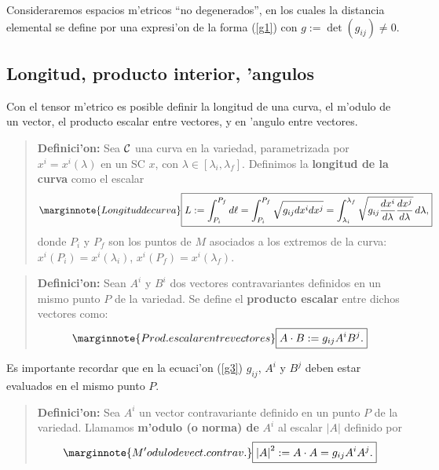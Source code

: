 Consideraremos espacios m'etricos ``no degenerados'', en los cuales la distancia
elemental se define por una expresi'on de la forma (\ref{g1}) con $g:=\det(g_{ij})\neq 0$.

\subsection{Longitud, producto interior, 'angulos}
Con el tensor m'etrico es posible definir la longitud de una curva, el m'odulo de un vector, el producto escalar entre vectores, y en 'angulo entre vectores.
\begin{quotation}
\textbf{Definici'on:} Sea $\cal C$ una curva en la variedad, parametrizada por $x^i =x^i(\lambda)$ en un SC $x$, con $\lambda\in[\lambda_i,\lambda_f]$. Definimos la
\textbf{longitud de la curva} como el escalar
\begin{equation}\marginnote{Longitud de curva}
\boxed{L:=\int_{P_i}^{P_f}d\ell=\int_{P_i}^{P_f}\sqrt
{g_{ij}dx^i dx^j }=\int_{\lambda_i}^{\lambda_{f}}\sqrt{g_{ij}\frac{dx^i}{d\lambda}\frac{dx^j }{d\lambda}}\,d\lambda, }
\label{g2}
\end{equation}
donde $P_i$ y $P_f$ son los puntos de $M$ asociados a los extremos de la curva: $x^i(P_i)=x^i(\lambda_i)$, $x^i(P_f)=x^i(\lambda_f)$.
\end{quotation}

\begin{quotation}
\textbf{Definici'on:} Sean $A^i $ y $B^i $ dos vectores contravariantes
definidos en un mismo punto $P$ de la variedad. Se define el \textbf{producto escalar}
entre dichos vectores como:
\begin{equation}\marginnote{Prod. escalar entre vectores}
\boxed{A\cdot B:= g_{ij}A^i B^j .} \label{g4}
\end{equation}
\end{quotation}

Es importante recordar que en la ecuaci'on (\ref{g3}) $g_{ij}$, $A^i $ y $B^j $
deben estar evaluados en el mismo punto $P$.

\begin{quotation}
\textbf{Definici'on:} Sea $A^i $ un vector contravariante definido en un
punto $P$ de la variedad. Llamamos \textbf{m'odulo (o norma) de} $A^i $ al
escalar $\left\vert A\right\vert$ definido por
\begin{equation}\marginnote{M'odulo de vect. contrav.}
\boxed{\left\vert A\right\vert ^2:= A\cdot A=g_{ij}A^i A^j .} \label{g3}
\end{equation}
\end{quotation}

